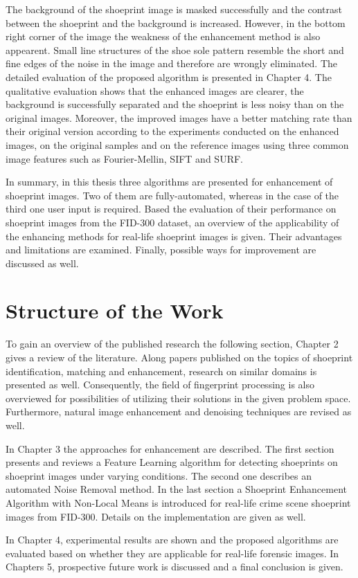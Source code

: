 \documentclass[draft,final]{vutinfth} %
\begin{document}
\par
The background of the shoeprint image is masked successfully and the contrast between the shoeprint and the background is increased.
However, in the bottom right corner of the image the weakness of the enhancement method is also appearent.
Small line structures of the shoe sole pattern resemble the short and fine edges of the noise in the image and therefore are wrongly eliminated.
The detailed evaluation of the proposed algorithm is presented in Chapter 4.
The qualitative evaluation shows that the enhanced images are clearer, the background is successfully separated and the shoeprint is less noisy than on the original images.
Moreover, the improved images have a better matching rate than their original version according to the experiments conducted on the enhanced images, on the original samples and on the reference images using three common image features such as Fourier-Mellin, SIFT and SURF.
\par
In summary, in this thesis three algorithms are presented for enhancement of shoeprint images.
Two of them are fully-automated, whereas in the case of the third one user input is required.
Based the evaluation of their performance on shoeprint images from the FID-300 dataset, an overview of the applicability of the enhancing methods for real-life shoeprint images is given.
Their advantages and limitations are examined.
Finally, possible ways for improvement are discussed as well.

\section{Structure of the Work}
\par
To gain an overview of the published research the following section, Chapter 2 gives a review of the literature. 
Along papers published on the topics of shoeprint identification, matching and enhancement, research on similar domains is presented as well.
Consequently, the field of fingerprint processing is also overviewed for possibilities of utilizing their solutions in the given problem space.
Furthermore, natural image enhancement and denoising techniques are revised as well.
\par
In Chapter 3 the approaches for enhancement are described.
The first section presents and reviews a Feature Learning algorithm for detecting shoeprints on shoeprint images under varying conditions.
The second one describes an automated Noise Removal method.
In the last section a Shoeprint Enhancement Algorithm with Non-Local Means is introduced for real-life crime scene shoeprint images from FID-300.
Details on the implementation are given as well.
\par
In Chapter 4, experimental results are shown and the proposed algorithms are evaluated based on whether they are applicable for real-life forensic images.
In Chapters 5, prospective future work is discussed and a final conclusion is given. 
\end{document}
